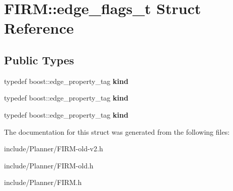 \hypertarget{struct_f_i_r_m_1_1edge__flags__t}{\section{\-F\-I\-R\-M\-:\-:edge\-\_\-flags\-\_\-t \-Struct \-Reference}
\label{struct_f_i_r_m_1_1edge__flags__t}
}
\subsection*{\-Public \-Types}
\begin{DoxyCompactItemize}
\item 
\hypertarget{struct_f_i_r_m_1_1edge__flags__t_a37a098e50779a7a6772be2ffa85502d4}{typedef boost\-::edge\-\_\-property\-\_\-tag {\bfseries kind}}\label{struct_f_i_r_m_1_1edge__flags__t_a37a098e50779a7a6772be2ffa85502d4}

\item 
\hypertarget{struct_f_i_r_m_1_1edge__flags__t_a37a098e50779a7a6772be2ffa85502d4}{typedef boost\-::edge\-\_\-property\-\_\-tag {\bfseries kind}}\label{struct_f_i_r_m_1_1edge__flags__t_a37a098e50779a7a6772be2ffa85502d4}

\item 
\hypertarget{struct_f_i_r_m_1_1edge__flags__t_a37a098e50779a7a6772be2ffa85502d4}{typedef boost\-::edge\-\_\-property\-\_\-tag {\bfseries kind}}\label{struct_f_i_r_m_1_1edge__flags__t_a37a098e50779a7a6772be2ffa85502d4}

\end{DoxyCompactItemize}


\-The documentation for this struct was generated from the following files\-:\begin{DoxyCompactItemize}
\item 
include/\-Planner/\-F\-I\-R\-M-\/old-\/v2.\-h\item 
include/\-Planner/\-F\-I\-R\-M-\/old.\-h\item 
include/\-Planner/\-F\-I\-R\-M.\-h\end{DoxyCompactItemize}
